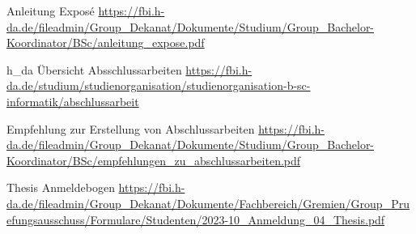 Anleitung Exposé
\url{https://fbi.h-da.de/fileadmin/Group_Dekanat/Dokumente/Studium/Group_Bachelor-Koordinator/BSc/anleitung_expose.pdf}

h\_da Übersicht Absschlussarbeiten
\url{https://fbi.h-da.de/studium/studienorganisation/studienorganisation-b-sc-informatik/abschlussarbeit}

Empfehlung zur Erstellung von Abschlussarbeiten
\url{https://fbi.h-da.de/fileadmin/Group_Dekanat/Dokumente/Studium/Group_Bachelor-Koordinator/BSc/empfehlungen_zu_abschlussarbeiten.pdf}

Thesis Anmeldebogen
\url{https://fbi.h-da.de/fileadmin/Group_Dekanat/Dokumente/Fachbereich/Gremien/Group_Pruefungsausschuss/Formulare/Studenten/2023-10_Anmeldung_04_Thesis.pdf}
\url{}
\url{}
\url{}
